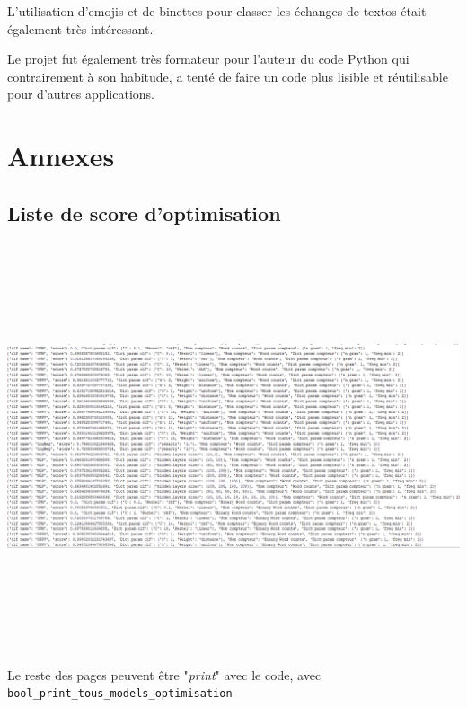 \documentclass[12pt,french]{article}
\begin{document}
L'utilisation d'emojis et de binettes pour classer les échanges de textos était également très intéressant.

Le projet fut également très formateur pour l'auteur du code Python qui contrairement à son habitude, a tenté de faire un code plus lisible et réutilisable pour d'autres applications. 




\section*{Annexes}
\subsection*{Liste de score d'optimisation}

\includegraphics[width=\linewidth,height=12cm,keepaspectratio]{page_1}

Le reste des pages peuvent être "\emph{print}" avec le code, avec \verb|bool_print_tous_models_optimisation|
\end{document}
